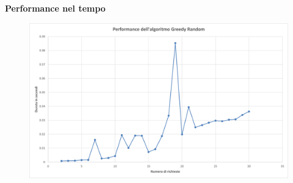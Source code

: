 \documentclass[9pt]{beamer}
\begin{document}
\begin{frame}[allowframebreaks]{\subsecname}
\framebreak

	\textbf{Performance nel tempo}
      	\begin{figure}[h]
	\centering
	\includegraphics[width=\textwidth]
	{../charts/07 Performance dell'algoritmo Greedy Random}
	\end{figure}

\end{frame}
\end{document}
